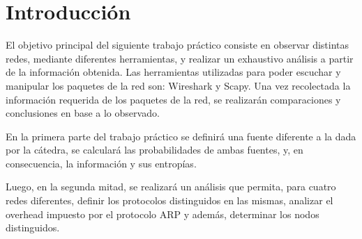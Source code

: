 \section{Introducción}
El objetivo principal del siguiente trabajo práctico consiste en observar distintas redes, mediante diferentes herramientas, y realizar un exhaustivo análisis a partir de la información obtenida. Las herramientas utilizadas para poder escuchar y manipular los paquetes de la red son: Wireshark y Scapy. Una vez recolectada la información requerida de los paquetes de la red, se realizarán comparaciones y conclusiones en base a lo observado. 

En la primera parte del trabajo práctico se definirá una fuente diferente a la dada por la cátedra, se calculará las probabilidades de ambas fuentes, y, en consecuencia, la información y sus entropías. 

Luego, en la segunda mitad, se realizará un análisis que permita, para cuatro redes diferentes, definir los protocolos distinguidos en las mismas, analizar el overhead impuesto por el protocolo ARP y además, determinar los nodos distinguidos.